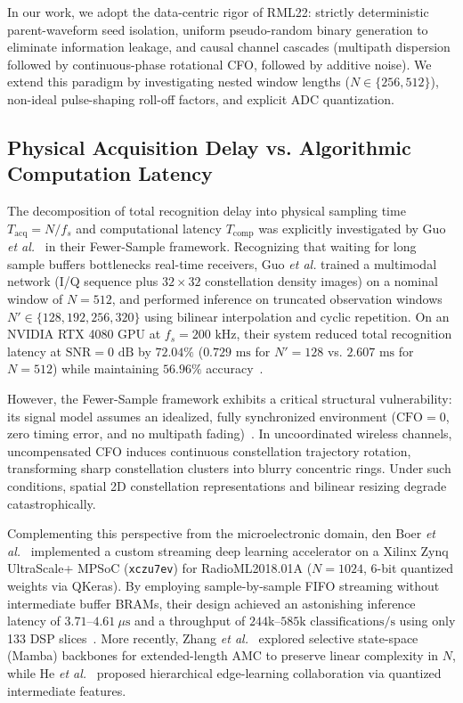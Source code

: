 In our work, we adopt the data-centric rigor of RML22: strictly deterministic parent-waveform seed isolation, uniform pseudo-random binary generation to eliminate information leakage, and causal channel cascades (multipath dispersion followed by continuous-phase rotational CFO, followed by additive noise). We extend this paradigm by investigating nested window lengths ($N \in \{256, 512\}$), non-ideal pulse-shaping roll-off factors, and explicit ADC quantization.

\subsection{Physical Acquisition Delay vs. Algorithmic Computation Latency}
\label{subsec:rel_fewersample_fpga}

The decomposition of total recognition delay into physical sampling time $T_{\text{acq}} = N/f_s$ and computational latency $T_{\text{comp}}$ was explicitly investigated by Guo \emph{et al.}~\cite{guo2025fewer} in their Fewer-Sample framework. Recognizing that waiting for long sample buffers bottlenecks real-time receivers, Guo \emph{et al.} trained a multimodal network (I/Q sequence plus $32\times 32$ constellation density images) on a nominal window of $N=512$, and performed inference on truncated observation windows $N' \in \{128, 192, 256, 320\}$ using bilinear interpolation and cyclic repetition. On an NVIDIA RTX 4080 GPU at $f_s = 200\text{ kHz}$, their system reduced total recognition latency at $\text{SNR} = 0\text{ dB}$ by $72.04\%$ ($0.729\text{ ms}$ for $N'=128$ vs. $2.607\text{ ms}$ for $N=512$) while maintaining $56.96\%$ accuracy~\cite[Table~I]{guo2025fewer}.

However, the Fewer-Sample framework exhibits a critical structural vulnerability: its signal model assumes an idealized, fully synchronized environment ($\text{CFO} = 0$, zero timing error, and no multipath fading)~\cite[Sec.~II-A]{guo2025fewer}. In uncoordinated wireless channels, uncompensated CFO induces continuous constellation trajectory rotation, transforming sharp constellation clusters into blurry concentric rings. Under such conditions, spatial 2D constellation representations and bilinear resizing degrade catastrophically.

Complementing this perspective from the microelectronic domain, den Boer \emph{et al.}~\cite{denboer2021fpga} implemented a custom streaming deep learning accelerator on a Xilinx Zynq UltraScale+ MPSoC (\texttt{xczu7ev}) for RadioML2018.01A ($N=1024$, 6-bit quantized weights via QKeras). By employing sample-by-sample FIFO streaming without intermediate buffer BRAMs, their design achieved an astonishing inference latency of $3.71\text{--}4.61\ \mu\text{s}$ and a throughput of $244\text{k--}585\text{k classifications/s}$ using only 133 DSP slices~\cite[Table~III]{denboer2021fpga}. More recently, Zhang \emph{et al.}~\cite{zhang2024mamc} explored selective state-space (Mamba) backbones for extended-length AMC to preserve linear complexity in $N$, while He \emph{et al.}~\cite{he2024edge} proposed hierarchical edge-learning collaboration via quantized intermediate features.

